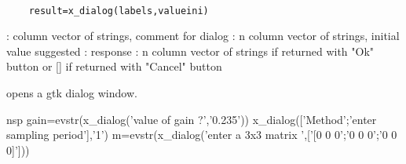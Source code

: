 
\begin{mandesc}
  \\ %
\end{mandesc}
\begin{calling_sequence}
  \begin{verbatim}
    result=x_dialog(labels,valueini)   
  \end{verbatim}
\end{calling_sequence}
\begin{parameters}
  \begin{varlist}
    : column vector of strings, comment for dialog
    : n column vector of strings, initial value suggested
    : response : n column vector of strings if returned with "Ok" button or [] if returned with "Cancel" button
  \end{varlist}
\end{parameters}
\begin{mandescription}
  opens a gtk dialog window.
\end{mandescription}
\begin{examples}
\begin{mintednsp}{nsp}
gain=evstr(x_dialog('value of gain ?','0.235'))
x_dialog(['Method';'enter sampling period'],'1')
m=evstr(x_dialog('enter a  3x3 matrix ',['[0 0 0';'0 0 0';'0 0 0]']))
\end{mintednsp}
\end{examples}
\begin{manseealso}
       
\end{manseealso}

